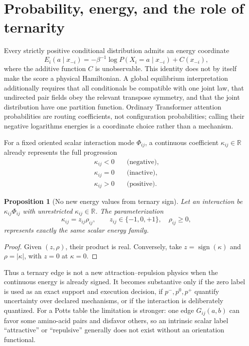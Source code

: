 \documentclass[10pt,twocolumn]{article}
\newcommand{\R}{\mathbb R}
\newcommand{\1}{\mathbf 1}
\newtheorem{proposition}{Proposition}
\theoremstyle{remark}
\begin{document}
\section{Probability, energy, and the role of ternarity}

Every strictly positive conditional distribution admits an energy coordinate
\begin{equation}
E_i(a\mid x_{-i})
=-\beta^{-1}\log P(X_i=a\mid x_{-i})+C(x_{-i}),
\label{eq:conditional-energy}
\end{equation}
where the additive function $C$ is unobservable.  This identity does not by itself make the score a
physical Hamiltonian.  A global equilibrium interpretation additionally requires that all
conditionals be compatible with one joint law, that undirected pair fields obey the relevant
transpose symmetry, and that the joint distribution have one partition function.  Ordinary
Transformer attention probabilities are routing coefficients, not configuration probabilities;
calling their negative logarithms energies is a coordinate choice rather than a mechanism.

For a fixed oriented scalar interaction mode $\Phi_{ij}$, a continuous coefficient
$\kappa_{ij}\in\R$ already represents the full progression
\begin{align}
\kappa_{ij}<0&\quad\text{(negative)},\nonumber\\
\kappa_{ij}=0&\quad\text{(inactive)},\nonumber\\
\kappa_{ij}>0&\quad\text{(positive)}.
\label{eq:continuous-three-regimes}
\end{align}

\begin{proposition}[No new energy values from ternary sign]
Let an interaction be $\kappa_{ij}\Phi_{ij}$ with unrestricted
$\kappa_{ij}\in\R$.  The parameterization
\begin{equation}
\kappa_{ij}=z_{ij}\rho_{ij},
\qquad z_{ij}\in\{-1,0,+1\},\quad \rho_{ij}\geq0,
\label{eq:sign-magnitude-reparameterization}
\end{equation}
represents exactly the same scalar energy family.
\end{proposition}

\begin{proof}
Given $(z,\rho)$, their product is real.  Conversely, take $z=\operatorname{sign}(\kappa)$ and
$\rho=|\kappa|$, with $z=0$ at $\kappa=0$.
\end{proof}

Thus a ternary edge is not a new attraction--repulsion physics when the continuous energy is
already signed.  It becomes substantive only if the zero label is used as an exact support and
execution decision, if $p^-,p^0,p^+$ quantify uncertainty over declared mechanisms, or if the
interaction is deliberately quantized.  For a Potts table the limitation is stronger: one edge
$G_{ij}(a,b)$ can favor some amino-acid pairs and disfavor others, so an intrinsic scalar label
``attractive'' or ``repulsive'' generally does not exist without an orientation functional.
\end{document}
